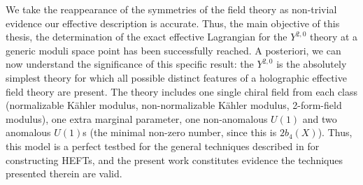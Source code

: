 We take the reappearance of the symmetries of the field theory as non-trivial evidence our effective description is accurate. Thus, the main objective of this thesis, the determination of the exact effective Lagrangian for the $Y^{2,0}$ theory at a generic moduli space point has been successfully reached. A posteriori, we can now understand the significance of this specific result: the $Y^{2,0}$ is the absolutely simplest theory for which all possible distinct features of a holographic effective field theory are present. The theory includes one single chiral field from each class (normalizable K\"ahler modulus, non-normalizable K\"ahler modulus, 2-form-field modulus), one extra marginal parameter, one non-anomalous $U(1)$ and two anomalous $U(1)$s (the minimal non-zero number, since this is $2b_4(X)$). Thus, this model is a perfect testbed for the general techniques described in \cite{MZ} for constructing HEFTs, and the present work constitutes evidence the techniques presented therein are valid.

